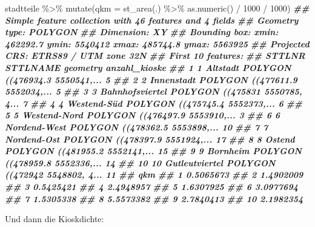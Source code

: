 \documentclass[11pt,german,a4paper]{article}
\newenvironment{Shaded}{\begin{snugshade}}{\end{snugshade}}
\newcommand{\AttributeTok}[1]{\textcolor[rgb]{0.77,0.63,0.00}{#1}}
\newcommand{\DecValTok}[1]{\textcolor[rgb]{0.00,0.00,0.81}{#1}}
\newcommand{\DocumentationTok}[1]{\textcolor[rgb]{0.56,0.35,0.01}{\textbf{\textit{#1}}}}
\newcommand{\FunctionTok}[1]{\textcolor[rgb]{0.00,0.00,0.00}{#1}}
\newcommand{\NormalTok}[1]{#1}
\newcommand{\SpecialCharTok}[1]{\textcolor[rgb]{0.00,0.00,0.00}{#1}}
\begin{document}
\begin{Shaded}
\begin{Highlighting}[]
\NormalTok{stadtteile }\SpecialCharTok{\%\textgreater{}\%}
  \FunctionTok{mutate}\NormalTok{(}\AttributeTok{qkm =} \FunctionTok{st\_area}\NormalTok{(.) }\SpecialCharTok{\%\textgreater{}\%} \FunctionTok{as.numeric}\NormalTok{() }\SpecialCharTok{/} \DecValTok{1000} \SpecialCharTok{/} \DecValTok{1000}\NormalTok{)}
\DocumentationTok{\#\# Simple feature collection with 46 features and 4 fields}
\DocumentationTok{\#\# Geometry type: POLYGON}
\DocumentationTok{\#\# Dimension:     XY}
\DocumentationTok{\#\# Bounding box:  xmin: 462292.7 ymin: 5540412 xmax: 485744.8 ymax: 5563925}
\DocumentationTok{\#\# Projected CRS: ETRS89 / UTM zone 32N}
\DocumentationTok{\#\# First 10 features:}
\DocumentationTok{\#\#    STTLNR        STTLNAME                       geometry anzahl\_kioske}
\DocumentationTok{\#\# 1       1        Altstadt POLYGON ((476934.3 5550541,...             5}
\DocumentationTok{\#\# 2       2      Innenstadt POLYGON ((477611.9 5552034,...             5}
\DocumentationTok{\#\# 3       3 Bahnhofsviertel POLYGON ((475831 5550785, 4...             7}
\DocumentationTok{\#\# 4       4     Westend{-}Süd POLYGON ((475745.4 5552373,...             6}
\DocumentationTok{\#\# 5       5    Westend{-}Nord POLYGON ((476497.9 5553910,...             3}
\DocumentationTok{\#\# 6       6    Nordend{-}West POLYGON ((478362.5 5553898,...            10}
\DocumentationTok{\#\# 7       7     Nordend{-}Ost POLYGON ((478397.9 5551924,...            17}
\DocumentationTok{\#\# 8       8          Ostend POLYGON ((481955.2 5552141,...            15}
\DocumentationTok{\#\# 9       9        Bornheim POLYGON ((478959.8 5552336,...            14}
\DocumentationTok{\#\# 10     10  Gutleutviertel POLYGON ((472942 5548802, 4...            11}
\DocumentationTok{\#\#          qkm}
\DocumentationTok{\#\# 1  0.5065673}
\DocumentationTok{\#\# 2  1.4902009}
\DocumentationTok{\#\# 3  0.5425421}
\DocumentationTok{\#\# 4  2.4948957}
\DocumentationTok{\#\# 5  1.6307925}
\DocumentationTok{\#\# 6  3.0977694}
\DocumentationTok{\#\# 7  1.5305338}
\DocumentationTok{\#\# 8  5.5573382}
\DocumentationTok{\#\# 9  2.7840413}
\DocumentationTok{\#\# 10 2.1982354}
\end{Highlighting}
\end{Shaded}

Und dann die Kioskdichte:
\end{document}
